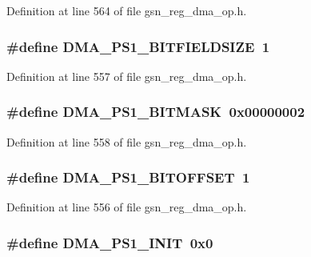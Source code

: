 Definition at line 564 of file gsn\_\-reg\_\-dma\_\-op.h.

\hypertarget{a00547_a6899e55753002b5d85c721bc3ee832d0}{
\subsubsection[{DMA\_\-PS1\_\-BITFIELDSIZE}]{\setlength{\rightskip}{0pt plus 5cm}\#define DMA\_\-PS1\_\-BITFIELDSIZE~1}}
\label{a00547_a6899e55753002b5d85c721bc3ee832d0}


Definition at line 557 of file gsn\_\-reg\_\-dma\_\-op.h.

\hypertarget{a00547_a374f7f39fd94bccc38496e571e768133}{
\subsubsection[{DMA\_\-PS1\_\-BITMASK}]{\setlength{\rightskip}{0pt plus 5cm}\#define DMA\_\-PS1\_\-BITMASK~0x00000002}}
\label{a00547_a374f7f39fd94bccc38496e571e768133}


Definition at line 558 of file gsn\_\-reg\_\-dma\_\-op.h.

\hypertarget{a00547_ad8174403f75638ab5556d21935f255b1}{
\subsubsection[{DMA\_\-PS1\_\-BITOFFSET}]{\setlength{\rightskip}{0pt plus 5cm}\#define DMA\_\-PS1\_\-BITOFFSET~1}}
\label{a00547_ad8174403f75638ab5556d21935f255b1}


Definition at line 556 of file gsn\_\-reg\_\-dma\_\-op.h.

\hypertarget{a00547_af7cd569bed2d5a72910feff0d9a83247}{
\subsubsection[{DMA\_\-PS1\_\-INIT}]{\setlength{\rightskip}{0pt plus 5cm}\#define DMA\_\-PS1\_\-INIT~0x0}}
\label{a00547_af7cd569bed2d5a72910feff0d9a83247}


